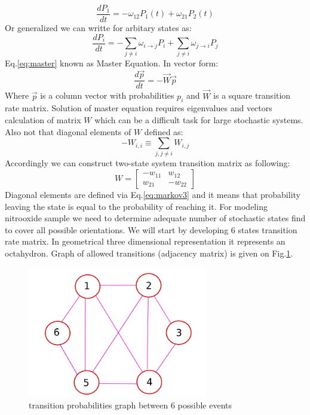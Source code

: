\begin{equation}\label{eq:masterlol}
\frac{dP_{1}}{dt}=-\omega_{12}P_{1}(t)+\omega_{21}P_{2}(t)
\end{equation}
Or generalized we can writte for arbitary states as: 
\begin{equation}\label{eq:master}
\frac{dP_{i}}{dt}=-\sum_{j\neq i}\omega_{i\rightarrow j}P_{i}+\sum_{j\neq i}\omega_{j\rightarrow i}P_{j}
\end{equation}
Eq.\ref{eq:master} known as Master Equation. In vector form:   
\begin{equation}\label{eq:matrix}
\frac{d\vec{p}}{dt}=-\vec{W}\vec{p}
\end{equation} 
Where $\vec{p}$ is a column vector with probabilities $p_i$ and $\vec{W}$ is a square transition rate matrix.
 Solution of master equation requires eigenvalues and vectors calculation of matrix $W$ which can be a difficult task for large stochastic systems. Also not that diagonal elements of $W$ defined as:  
\begin{equation}\label{eq:markov3}
-W_{i,i}\equiv\sum_{j,j\neq i}W_{i,j}
\end{equation} 
Accordingly we can construct two-state system transition matrix as following:   
\begin{equation}\label{eq:55}
W = \begin{bmatrix}
       -w_{11} & w_{12}  \\[0.3em]
        w_{21} & -w_{22}  
     \end{bmatrix}
\end{equation}
Diagonal elements are defined via Eq.\ref{eq:markov3} and it means that probability leaving the state is equal to the probability of reaching it.
For modeling nitrooxide sample we need to determine adequate number of stochastic states find to cover all possible orientations. We will start by developing 6 states transition rate matrix. In geometrical three dimensional representation it represents an octahydron. Graph of allowed transitions (adjacency matrix) is given on Fig.\ref{figure:wdiagramm}.     
\begin{figure}[h!]
\begin{center}
\includegraphics[width=0.7\textwidth]{figures/chap2/wdiagramm.png}
\caption{transition probabilities graph between 6 possible events}
\label{figure:wdiagramm}
\end{center}
\end{figure}

